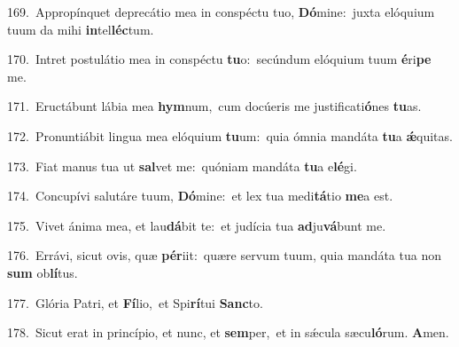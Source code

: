 {\numbfont\textcolor{\numbcolor}{169.}}~Appropínquet deprecátio mea in conspéctu tuo, \textbf{Dó}\-mine:~\star juxta elóquium tuum da mihi \textbf{in}\-tel\-\textbf{léc}\-tum.\par
{\numbfont\textcolor{\numbcolor}{170.}}~Intret postulátio mea in conspéctu \textbf{tu}\-o:~\star secúndum elóquium tuum \textbf{é}\-ri\textbf{pe} me.\par
{\numbfont\textcolor{\numbcolor}{171.}}~Eructábunt lábia mea \textbf{hym}\-num,~\star cum docúeris me justificati\-\textbf{ó}\-nes \textbf{tu}\-as.\par
{\numbfont\textcolor{\numbcolor}{172.}}~Pronuntiábit lingua mea elóquium \textbf{tu}\-um:~\star quia ómnia mandáta \textbf{tu}\-a \textbf{ǽ}\-quitas.\par
{\numbfont\textcolor{\numbcolor}{173.}}~Fiat manus tua ut \textbf{sal}\-vet me:~\star quóniam mandáta \textbf{tu}\-a e\-\textbf{lé}\-gi.\par
{\numbfont\textcolor{\numbcolor}{174.}}~Concupívi salutáre tuum, \textbf{Dó}\-mine:~\star et lex tua medi\-\textbf{tá}\-tio \textbf{me}\-a est.\par
{\numbfont\textcolor{\numbcolor}{175.}}~Vivet ánima mea, et lau\-\textbf{dá}\-bit te:~\star et judícia tua \textbf{ad}\-ju\-\textbf{vá}\-bunt me.\par
{\numbfont\textcolor{\numbcolor}{176.}}~Errávi, sicut ovis, quæ \textbf{pér}\-iit:~\star quære servum tuum, quia mandáta tua non \textbf{sum} ob\-\textbf{lí}\-tus.\par
{\numbfont\textcolor{\numbcolor}{177.}}~Glória Patri, et \textbf{Fí}\-lio,~\star et Spi\-\textbf{rí}\-tui \textbf{Sanc}\-to.\par
{\numbfont\textcolor{\numbcolor}{178.}}~Sicut erat in princípio, et nunc, et \textbf{sem}\-per,~\star et in sǽcula sæcu\-\textbf{ló}\-rum. \textbf{A}\-men.\par

